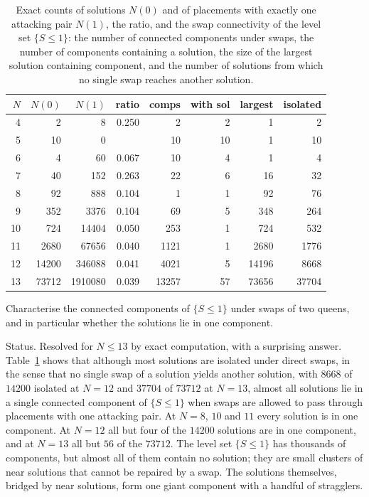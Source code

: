 \begin{table}[t]
\centering
\small
\caption{Exact counts of solutions $N(0)$ and of placements with exactly one attacking pair $N(1)$, the ratio, and the swap connectivity of the level set $\{ S \le 1 \}$: the number of connected components under swaps, the number of components containing a solution, the size of the largest solution containing component, and the number of solutions from which no single swap reaches another solution.}
\label{tab:n1}
\begin{tabular}{rrrrrrrr}
\toprule
$N$ & $N(0)$ & $N(1)$ & ratio & comps & with sol & largest & isolated \\
\midrule
4 & 2 & 8 & 0.250 & 2 & 2 & 1 & 2 \\
5 & 10 & 0 & & 10 & 10 & 1 & 10 \\
6 & 4 & 60 & 0.067 & 10 & 4 & 1 & 4 \\
7 & 40 & 152 & 0.263 & 22 & 6 & 16 & 32 \\
8 & 92 & 888 & 0.104 & 1 & 1 & 92 & 76 \\
9 & 352 & 3376 & 0.104 & 69 & 5 & 348 & 264 \\
10 & 724 & 14404 & 0.050 & 253 & 1 & 724 & 532 \\
11 & 2680 & 67656 & 0.040 & 1121 & 1 & 2680 & 1776 \\
12 & 14200 & 346088 & 0.041 & 4021 & 5 & 14196 & 8668 \\
13 & 73712 & 1910080 & 0.039 & 13257 & 57 & 73656 & 37704 \\
\bottomrule
\end{tabular}
\end{table}

\begin{problem}
Characterise the connected components of $\{ S \le 1 \}$ under swaps of two queens, and in particular whether the solutions lie in one component.
\end{problem}

Status. Resolved for $N \le 13$ by exact computation, with a surprising answer. Table~\ref{tab:n1} shows that although most solutions are isolated under direct swaps, in the sense that no single swap of a solution yields another solution, with $8668$ of $14200$ isolated at $N = 12$ and $37704$ of $73712$ at $N = 13$, almost all solutions lie in a single connected component of $\{ S \le 1 \}$ when swaps are allowed to pass through placements with one attacking pair. At $N = 8$, $10$ and $11$ every solution is in one component. At $N = 12$ all but four of the $14200$ solutions are in one component, and at $N = 13$ all but $56$ of the $73712$. The level set $\{ S \le 1 \}$ has thousands of components, but almost all of them contain no solution; they are small clusters of near solutions that cannot be repaired by a swap. The solutions themselves, bridged by near solutions, form one giant component with a handful of stragglers.

